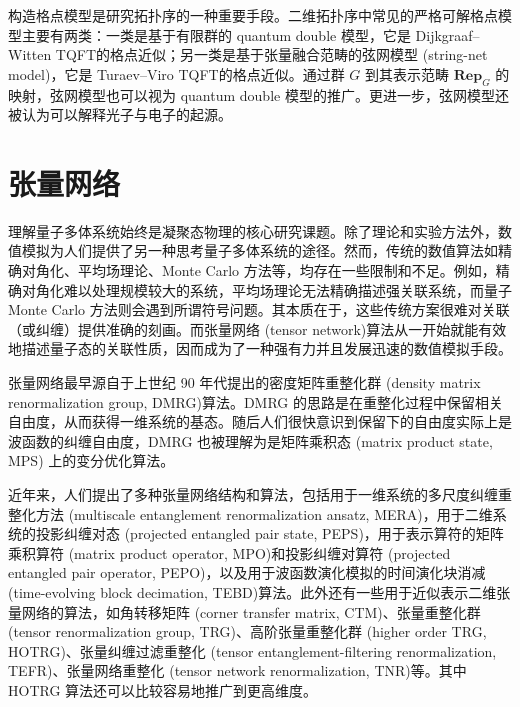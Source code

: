 构造格点模型是研究拓扑序的一种重要手段。二维拓扑序中常见的严格可解格点模型主要有两类：一类是基于有限群的 quantum double 模型\cite{kitaev2003fault,kitaev2006anyons}，它是 Dijkgraaf--Witten TQFT\cite{dijkgraaf1990topological}的格点近似；另一类是基于张量融合范畴的弦网模型 (string-net model)\cite{levin2005string}，它是 Turaev--Viro TQFT\cite{turaev1992state,kirillov2011string}的格点近似。通过群 $G$ 到其表示范畴 $\mathbf{Rep}_G$ 的映射，弦网模型也可以视为 quantum double 模型的推广\cite{buerschaper2009mapping,buerschaper2013electric}。更进一步，弦网模型还被认为可以解释光子与电子的起源\cite{levin2005colloquium}。

\section{张量网络}

理解量子多体系统始终是凝聚态物理的核心研究课题。除了理论和实验方法外，数值模拟为人们提供了另一种思考量子多体系统的途径。然而，传统的数值算法如精确对角化、平均场理论、Monte Carlo 方法等，均存在一些限制和不足。例如，精确对角化难以处理规模较大的系统，平均场理论无法精确描述强关联系统，而量子 Monte Carlo 方法则会遇到所谓符号问题。其本质在于，这些传统方案很难对关联（或纠缠）提供准确的刻画。而张量网络 (tensor network)\cite{orus2014practical,bridgeman2017hand,biamonte2017tensor,orus2019tensor,ran2020tensor,evenbly2022practical}算法从一开始就能有效地描述量子态的关联性质，因而成为了一种强有力并且发展迅速的数值模拟手段。

张量网络最早源自于上世纪 90 年代提出的密度矩阵重整化群 (density matrix renormalization group, DMRG)\cite{white1992density,white1993density,schollwock2005density}算法。DMRG 的思路是在重整化过程中保留相关自由度，从而获得一维系统的基态。随后人们很快意识到保留下的自由度实际上是波函数的纠缠自由度，DMRG 也被理解为是矩阵乘积态 (matrix product state, MPS) 上的变分优化算法\cite{mcculloch2007density,perez2007matrix,verstraete2008matrix,schollwock2011density}。

近年来，人们提出了多种张量网络结构和算法，包括用于一维系统的多尺度纠缠重整化方法 (multiscale entanglement renormalization ansatz, MERA)\cite{vidal2007entanglement,evenbly2009algorithms,evenbly2014algorithms}，用于二维系统的投影纠缠对态 (projected entangled pair state, PEPS)\cite{verstraete2004renormalization}，用于表示算符的矩阵乘积算符 (matrix product operator, MPO)\cite{pirvu2010matrix}和投影纠缠对算符 (projected entangled pair operator, PEPO)\cite{czarnik2015variational}，以及用于波函数演化模拟的时间演化块消减 (time-evolving block decimation, TEBD)\cite{vidal2003efficient,vidal2004efficient,vidal2007classical,orus2008infinite}算法。此外还有一些用于近似表示二维张量网络的算法，如角转移矩阵 (corner transfer matrix, CTM)\cite{nishino1996corner,orus2012exploring}、张量重整化群 (tensor renormalization group, TRG)\cite{levin2007tensor}、高阶张量重整化群 (higher order TRG, HOTRG)\cite{xie2012coarse}、张量纠缠过滤重整化 (tensor entanglement-filtering renormalization, TEFR)\cite{gu2009tensor1}、张量网络重整化 (tensor network renormalization, TNR)\cite{evenbly2015tensor1,evenbly2017algorithms}\allowbreak 等。其中 HOTRG 算法还可以比较容易地推广到更高维度。

